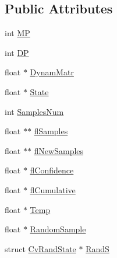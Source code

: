 \subsection*{Public Attributes}
\begin{DoxyCompactItemize}
\item 
int \hyperlink{structCvConDensation_aaf20064b655233feecf1fbb351c8d958}{M\-P}
\item 
int \hyperlink{structCvConDensation_a43b9bf49588e345a91c3329e2320de37}{D\-P}
\item 
float $\ast$ \hyperlink{structCvConDensation_a511b6ad31e2d2958ba2693299f6f2082}{Dynam\-Matr}
\item 
float $\ast$ \hyperlink{structCvConDensation_ae20ded637cab2f5d7415914a5c1b1278}{State}
\item 
int \hyperlink{structCvConDensation_a5607457e894fd6dc74a3c69d3a608821}{Samples\-Num}
\item 
float $\ast$$\ast$ \hyperlink{structCvConDensation_a82334e3d4b15191e9d4527ffdd33815c}{fl\-Samples}
\item 
float $\ast$$\ast$ \hyperlink{structCvConDensation_a5d14f16db70d33113b4840eebdee136f}{fl\-New\-Samples}
\item 
float $\ast$ \hyperlink{structCvConDensation_a495e8f03977700a19bbc3096f79ab713}{fl\-Confidence}
\item 
float $\ast$ \hyperlink{structCvConDensation_a78a0d99ab85f57c1a9f69b6dfd5ac150}{fl\-Cumulative}
\item 
float $\ast$ \hyperlink{structCvConDensation_a5c358b1adb2685490cfb43dec24d51ee}{Temp}
\item 
float $\ast$ \hyperlink{structCvConDensation_a712403785f8c84c01543e705d003b083}{Random\-Sample}
\item 
struct \hyperlink{structCvRandState}{Cv\-Rand\-State} $\ast$ \hyperlink{structCvConDensation_ae06c202a93a2f06a8664dd33241afb20}{Rand\-S}
\end{DoxyCompactItemize}



